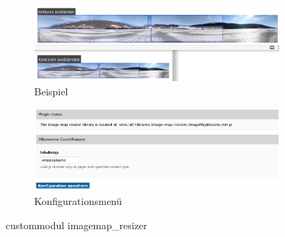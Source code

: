 \begin{figure}[H]
	\centering
	\begin{subfigure}[b]{0.45\textwidth}
		\centering
		\includegraphics[width=0.95\linewidth]{images/example_imagemapresizer}
		\caption[]{Beispiel}
		\label{fig:example_imagemapresizer}
	\end{subfigure}
	\begin{subfigure}[b]{0.45\textwidth}
		\centering
		\includegraphics[width=0.95\linewidth]{images/config_imagemapresizer}
		\caption[]{Konfigurationsmenü}
		\label{fig:config_imagemapresizer}
	\end{subfigure}
	\caption{\gls{custommodul} imagemap\_resizer}
	\label{fig:imagemap_resizer}
\end{figure}


